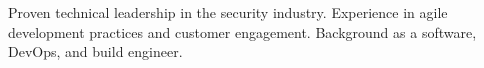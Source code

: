 

\begin{cvparagraph}

Proven technical leadership in the security industry. Experience in agile development practices and customer engagement. Background as a software, DevOps, and build engineer.
\end{cvparagraph}
